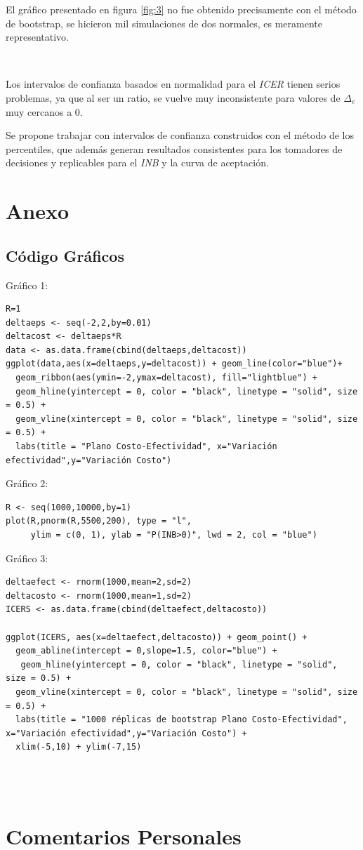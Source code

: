 \documentclass{article}
\begin{document}
El gráfico presentado en figura \ref{fig:3} no fue obtenido precisamente con el método de bootstrap, se hicieron mil simulaciones de dos normales, es meramente representativo.

\

Los intervalos de confianza basados en normalidad para el \textit{ICER} tienen serios problemas, ya que al ser un ratio, se vuelve muy inconsistente para valores de $\Delta_e$ muy cercanos a 0.

Se propone trabajar con intervalos de confianza construidos con el método de los percentiles, que además generan resultados consistentes para los tomadores de decisiones y replicables para el \textit{INB} y la curva de aceptación.



\section{Anexo}
\subsection{Código Gráficos}

Gráfico 1:
\begin{verbatim}
R=1
deltaeps <- seq(-2,2,by=0.01)
deltacost <- deltaeps*R
data <- as.data.frame(cbind(deltaeps,deltacost))
ggplot(data,aes(x=deltaeps,y=deltacost)) + geom_line(color="blue")+
  geom_ribbon(aes(ymin=-2,ymax=deltacost), fill="lightblue") +
  geom_hline(yintercept = 0, color = "black", linetype = "solid", size = 0.5) +
  geom_vline(xintercept = 0, color = "black", linetype = "solid", size = 0.5) +
  labs(title = "Plano Costo-Efectividad", x="Variación efectividad",y="Variación Costo")
\end{verbatim}


Gráfico 2:
\begin{verbatim}
R <- seq(1000,10000,by=1)
plot(R,pnorm(R,5500,200), type = "l",
     ylim = c(0, 1), ylab = "P(INB>0)", lwd = 2, col = "blue")
\end{verbatim}


Gráfico 3:
\begin{verbatim}
deltaefect <- rnorm(1000,mean=2,sd=2)
deltacosto <- rnorm(1000,mean=1,sd=2)
ICERS <- as.data.frame(cbind(deltaefect,deltacosto))

ggplot(ICERS, aes(x=deltaefect,deltacosto)) + geom_point() +
  geom_abline(intercept = 0,slope=1.5, color="blue") +
   geom_hline(yintercept = 0, color = "black", linetype = "solid", size = 0.5) +
  geom_vline(xintercept = 0, color = "black", linetype = "solid", size = 0.5) +
  labs(title = "1000 réplicas de bootstrap Plano Costo-Efectividad", x="Variación efectividad",y="Variación Costo") +
  xlim(-5,10) + ylim(-7,15)




\end{verbatim}

\section{Comentarios Personales}
\end{document}
